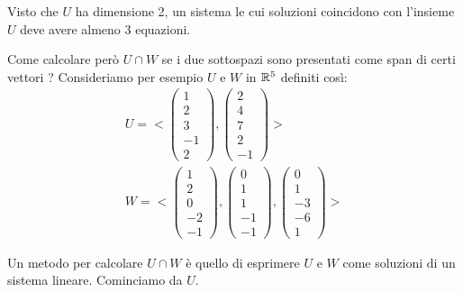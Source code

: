 \begin{observation}
	Visto che $U$ ha dimensione 2, un sistema le cui soluzioni coincidono con
	l'insieme $U$ deve avere almeno 3 equazioni.
\end{observation}

Come calcolare però $U \cap W$ se i due sottospazi sono presentati come span
di certi vettori ? Consideriamo per esempio $U$ e $W$ in $\mathbb{R}^5$
definiti così:
\begin{gather*}
	U = <\begin{pmatrix}
		1 \\ 2 \\ 3 \\ -1 \\ 2
	\end{pmatrix},
	\begin{pmatrix}
		2 \\ 4 \\ 7 \\ 2 \\ -1
	\end{pmatrix}> \\
	W = <\begin{pmatrix}
		1 \\ 2 \\ 0 \\ -2 \\ -1
	\end{pmatrix},
	\begin{pmatrix}
		0 \\ 1 \\ 1 \\ -1 \\ -1
	\end{pmatrix},
	\begin{pmatrix}
		0 \\ 1 \\ -3 \\ -6 \\ 1
	\end{pmatrix}>
\end{gather*}

Un metodo per calcolare $U \cap W$ è quello di esprimere $U$ e $W$ come
soluzioni di un sistema lineare. Cominciamo da $U$.

